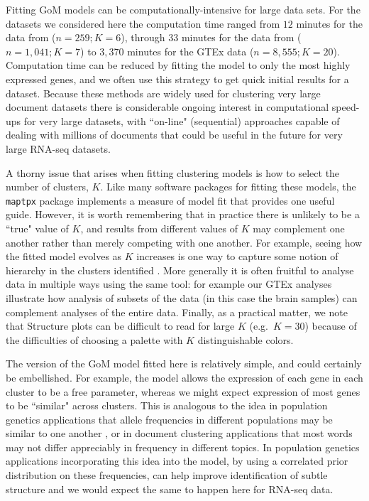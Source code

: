\documentclass[10pt,letterpaper]{article}
\begin{document}
Fitting GoM models can be computationally-intensive for large data sets. For the datasets we considered here the computation time ranged from $12$ minutes for the data from \cite{Deng2014} ($n=259; K=6$), through $33$ minutes for the
data from \cite{Jaitin2014} ($n=1,041; K=7$) to $3,370$ minutes for the GTEx data ($n=8,555; K=20$).
Computation time can be reduced by fitting the model to only the most highly expressed genes, and we often use this strategy to get quick initial results for a dataset.
Because these methods are widely used for clustering very large document datasets there is considerable ongoing interest in
computational speed-ups for very large datasets, with ``on-line" (sequential) approaches capable of dealing with millions of documents  \cite{Hoffman2010} that could be useful in the future for very large RNA-seq datasets.


A thorny issue that arises when fitting clustering models is how to select the number of clusters, $K$. Like many software packages
for fitting these models, the {\tt maptpx} package implements a measure of model fit that provides one useful guide. However, it is
worth remembering that in practice there is unlikely to be a ``true" value of $K$, and results from different
values of $K$ may complement one another rather than merely competing with one another. For example, seeing how the fitted model evolves
as $K$ increases is one way to capture some notion of hierarchy in the clusters identified \cite{Rosenberg2002}. More generally it is often
fruitful to analyse data in multiple ways using the same tool: for example our GTEx analyses illustrate how
analysis of subsets of the data (in this case the brain samples) can complement analyses of the entire data. Finally, as a practical matter,
we note that Structure plots can be difficult to read for large $K$ (e.g.~$K=30$) because of the difficulties of choosing a palette with $K$ distinguishable colors.

The version of the GoM model fitted here is relatively simple, and could certainly be embellished. For example, the model allows the expression of each gene in each cluster to be a free parameter, whereas we might expect expression of most
genes to be ``similar" across clusters. This is analogous to the idea in population genetics applications that allele frequencies in different populations may
be similar to one another \cite{Falush2003}, or in document clustering applications that most words may not differ appreciably in frequency in different topics.
In population genetics applications incorporating this idea into the model, by using a correlated prior distribution on these frequencies,
can help improve identification of subtle structure \cite{Falush2003} and we would expect the same to happen here for RNA-seq data.
\end{document}
